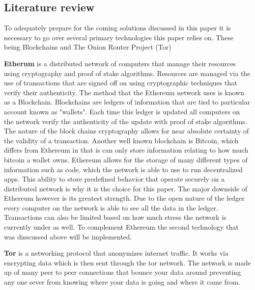 \documentclass{article}
\begin{document}
\begin{center}
	\section*{Literature review}
\end{center}

To adequately prepare for the coming solutions discussed in this paper it is necessary to go over several primary technologies this paper relies on. These being Blockchains and The Onion Router Project (Tor)

\textbf{Etherum} is a distributed network of computers that manage their resources using cryptography and proof of stake algorithms. Resources are managed via the use of transactions that are signed off on using cryptographic techniques that verify their authenticity. The method that the Ethereum network uses is known as a Blockchain. Blockchains are ledgers of information that are tied to particular account known as "wallets". Each time this ledger is updated all computers on the network verify the authenticity of the update with proof of stake algorithms. The nature of the block chains cryptography allows for near absolute certainty of the validity of a transaction. Another well known blockchain is Bitcoin, which differs from Ethereum in that is can only store information relating to how much bitcoin a wallet owns. Ethereum allows for the storage of many different types of information such as code, which the network is able to use to run decentralized apps. This ability to store predefined behavior that operate securely on a distributed network is why it is the choice for this paper. The major downside of Ethereum however is its greatest strength. Due to the open nature of the ledger every computer on the network is able to see all the data in the ledger. Transactions can also be limited based on how much stress the network is currently under as well. To complement Ethereum the second technology that was disscussed above will be implemented.

\textbf{Tor} is a networking protocol that anonymizes internet traffic. It works via encrypting data which is then sent through the tor network. The network is made up of many peer to peer connections that bounce your data around preventing any one sever from knowing where your data is going and where it came from.
\end{document}
